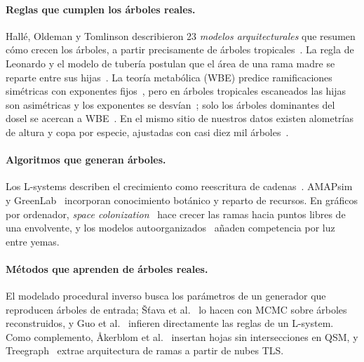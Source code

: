 \documentclass[11pt,a4paper]{article}
\begin{document}
\paragraph{Reglas que cumplen los árboles reales.}
Hallé, Oldeman y Tomlinson describieron 23 \emph{modelos arquitecturales} que resumen cómo crecen los árboles, a partir precisamente de árboles tropicales~\cite{halle1978tropical}. La regla de Leonardo y el modelo de tubería postulan que el área de una rama madre se reparte entre sus hijas~\cite{shinozaki1964pipe}. La teoría metabólica (WBE) predice ramificaciones simétricas con exponentes fijos~\cite{west1997general,west1999plant}, pero en árboles tropicales escaneados las hijas son asimétricas y los exponentes se desvían~\cite{lau2019metabolic,yang2024treegraph}; solo los árboles dominantes del dosel se acercan a WBE~\cite{martinducup2020convergence}. En el mismo sitio de nuestros datos existen alometrías de altura y copa por especie, ajustadas con casi diez mil árboles~\cite{martinezcano2019allometry}.

\paragraph{Algoritmos que generan árboles.}
Los L-systems describen el crecimiento como reescritura de cadenas~\cite{lindenmayer1968mathematical,prusinkiewicz1990algorithmic}. AMAPsim~\cite{barczi2008amapsim} y GreenLab~\cite{yan2004greenlab} incorporan conocimiento botánico y reparto de recursos. En gráficos por ordenador, \emph{space colonization}~\cite{runions2007space} hace crecer las ramas hacia puntos libres de una envolvente, y los modelos autoorganizados~\cite{palubicki2009selforganizing} añaden competencia por luz entre yemas.

\paragraph{Métodos que aprenden de árboles reales.}
El modelado procedural inverso busca los parámetros de un generador que reproducen árboles de entrada; Šťava et al.~\cite{stava2014inverse} lo hacen con MCMC sobre árboles reconstruidos, y Guo et al.~\cite{guo2020inverse} infieren directamente las reglas de un L-system. Como complemento, Åkerblom et al.~\cite{akerblom2018leaf} insertan hojas sin intersecciones en QSM, y Treegraph~\cite{yang2024treegraph} extrae arquitectura de ramas a partir de nubes TLS.
\end{document}
